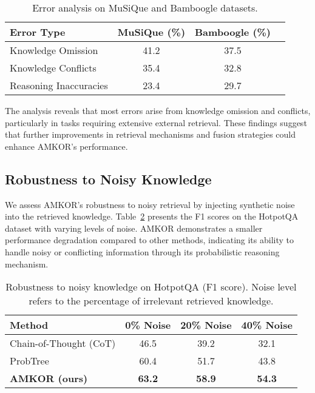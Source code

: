 \begin{table}[ht]
\centering
\caption{Error analysis on MuSiQue and Bamboogle datasets.}
\label{tab:error_analysis}
\begin{tabular}{lccc}
\toprule
\textbf{Error Type} & \textbf{MuSiQue (\%)} & \textbf{Bamboogle (\%)} \\
\midrule
Knowledge Omission & 41.2 & 37.5 \\
Knowledge Conflicts & 35.4 & 32.8 \\
Reasoning Inaccuracies & 23.4 & 29.7 \\
\bottomrule
\end{tabular}
\end{table}

The analysis reveals that most errors arise from knowledge omission and conflicts, particularly in tasks requiring extensive external retrieval. These findings suggest that further improvements in retrieval mechanisms and fusion strategies could enhance AMKOR's performance.

\subsection{Robustness to Noisy Knowledge}

We assess AMKOR's robustness to noisy retrieval by injecting synthetic noise into the retrieved knowledge. Table~\ref{tab:noise_robustness} presents the F1 scores on the HotpotQA dataset with varying levels of noise. AMKOR demonstrates a smaller performance degradation compared to other methods, indicating its ability to handle noisy or conflicting information through its probabilistic reasoning mechanism.

\begin{table}[ht]
\centering
\caption{Robustness to noisy knowledge on HotpotQA (F1 score). Noise level refers to the percentage of irrelevant retrieved knowledge.}
\label{tab:noise_robustness}
\begin{tabular}{lccc}
\toprule
\textbf{Method} & \textbf{0\% Noise} & \textbf{20\% Noise} & \textbf{40\% Noise} \\
\midrule
Chain-of-Thought (CoT) & 46.5 & 39.2 & 32.1 \\
ProbTree & 60.4 & 51.7 & 43.8 \\
\textbf{AMKOR (ours)} & \textbf{63.2} & \textbf{58.9} & \textbf{54.3} \\
\bottomrule
\end{tabular}
\end{table}

